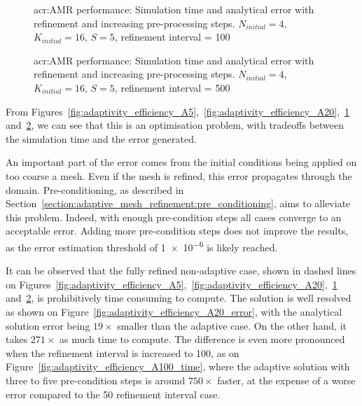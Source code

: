 \begin{figure}[H]
	\centering
	\hfill
	\caption{\Acrlong{acr:AMR} performance: Simulation time and analytical error with refinement and increasing pre-processing steps. \(N_{initial} = 4\), \(K_{initial} = 16\), \(S = 5\), refinement interval = 100}\label{fig:adaptivity_efficiency_A100}
\end{figure}

\begin{figure}[H]
	\centering
	\hfill
	\caption{\Acrlong{acr:AMR} performance: Simulation time and analytical error with refinement and increasing pre-processing steps. \(N_{initial} = 4\), \(K_{initial} = 16\), \(S = 5\), refinement interval = 500}\label{fig:adaptivity_efficiency_A500}
\end{figure}

From
Figures~\ref{fig:adaptivity_efficiency_A5},~\ref{fig:adaptivity_efficiency_A20},~\ref{fig:adaptivity_efficiency_A100}
and~\ref{fig:adaptivity_efficiency_A500}, we can see that this is an optimisation problem, with
tradeoffs between the simulation time and the error generated.

An important part of the error comes from the initial conditions being applied on too coarse a mesh.
Even if the mesh is refined, this error propagates through the domain. Pre-conditioning, as
described in Section~\ref{section:adaptive_mesh_refinement:pre_conditioning}, aims to alleviate this
problem. Indeed, with enough pre-condition steps all cases converge to an acceptable error. Adding
more pre-condition steps does not improve the results, as the error estimation threshold of
\num{1e-6} is likely reached.

It can be observed that the fully refined non-adaptive case, shown in dashed lines on
Figures~\ref{fig:adaptivity_efficiency_A5},~\ref{fig:adaptivity_efficiency_A20},~\ref{fig:adaptivity_efficiency_A100}
and~\ref{fig:adaptivity_efficiency_A500}, is prohibitively time consuming to compute. The solution
is well resolved as shown on Figure~\ref{fig:adaptivity_efficiency_A20_error}, with the analytical
solution error being \(19 \times \) smaller than the adaptive case. On the other hand, it takes
\(271 \times \) as much time to compute. The difference is even more pronounced when the refinement
interval is increased to 100, as on Figure~\ref{fig:adaptivity_efficiency_A100_time}, where the
adaptive solution with three to five pre-condition steps is around \(750 \times \) faster, at the
expense of a worse error compared to the 50 refinement interval case.

